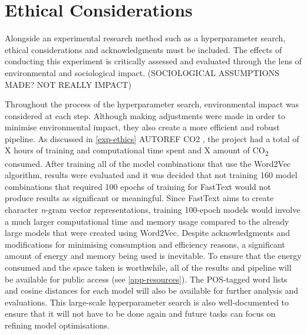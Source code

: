 \section{Ethical Considerations}
\label{sec:ethicalcons}

Alongside an experimental research method such as a hyperparameter search, ethical considerations and acknowledgments must be included. The effects of conducting this experiment is critically assessed and evaluated through the lens of environmental and sociological impact. (SOCIOLOGICAL ASSUMPTIONS MADE? NOT REALLY IMPACT) 

Throughout the process of the hyperparameter search, environmental impact was considered at each step. Although making adjustments were made in order to minimise environmental impact, they also create a more efficient and robust pipeline. As discussed in \autoref{exp-ethics} AUTOREF CO2 , the project had a total of X hours of training and computational time spent and X amount of CO\textsubscript{2} consumed. After training all of the model combinations that use the Word2Vec algorithm, results were evaluated and it was decided that not training 160 model combinations that required 100 epochs of training for FastText would not produce results as significant or meaningful. Since FastText aims to create character \emph{n}-gram vector representations, training 100-epoch models would involve a much larger computational time and memory usage compared to the already large models that were created using Word2Vec. Despite acknowledgments and modifications for minimising consumption and efficiency reasons, a significant amount of energy and memory being used is inevitable. To ensure that the energy consumed and the space taken is worthwhile, all of the results and pipeline will be available for public access (see \autoref{app-resources}). The POS-tagged word lists and cosine distances for each model will also be available for further analysis and evaluations. This large-scale hyperparameter search is also well-documented to ensure that it will not have to be done again and future tasks can focus on refining model optimisations. 

